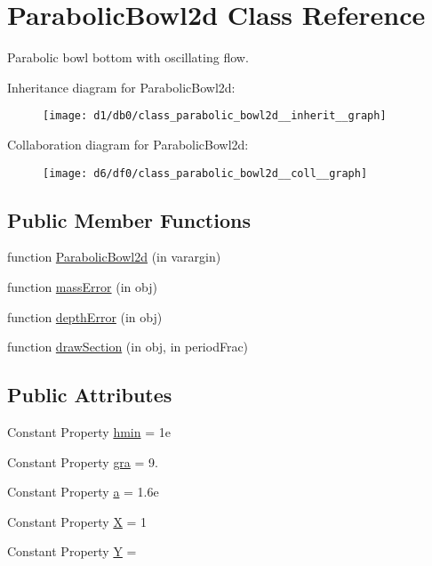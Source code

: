 \hypertarget{class_parabolic_bowl2d}{}\section{Parabolic\+Bowl2d Class Reference}
\label{class_parabolic_bowl2d}


Parabolic bowl bottom with oscillating flow.  




Inheritance diagram for Parabolic\+Bowl2d\+:
\nopagebreak
\begin{figure}[H]
\begin{center}
\leavevmode
\texttt{[image: d1/db0/class\_parabolic\_bowl2d\_\_inherit\_\_graph]}
\end{center}
\end{figure}


Collaboration diagram for Parabolic\+Bowl2d\+:
\nopagebreak
\begin{figure}[H]
\begin{center}
\leavevmode
\texttt{[image: d6/df0/class\_parabolic\_bowl2d\_\_coll\_\_graph]}
\end{center}
\end{figure}
\subsection*{Public Member Functions}
\begin{DoxyCompactItemize}
\item 
function \hyperlink{class_parabolic_bowl2d_a3cf3b16ee5279cc0a9c6782e0bbd40cd}{Parabolic\+Bowl2d} (in varargin)
\item 
function \hyperlink{class_parabolic_bowl2d_a63eb70cd672d3b7eb49076181c51cacf}{mass\+Error} (in obj)
\item 
function \hyperlink{class_parabolic_bowl2d_acf9645dce26099da0f6347d47b80c307}{depth\+Error} (in obj)
\item 
function \hyperlink{class_parabolic_bowl2d_a66ac4c5a907d4a699a11724d96baca43}{draw\+Section} (in obj, in period\+Frac)
\end{DoxyCompactItemize}
\subsection*{Public Attributes}
\begin{DoxyCompactItemize}
\item 
Constant Property \hyperlink{class_parabolic_bowl2d_a25af2e40c35473e7c5d68fcfa1014f44}{hmin} = 1e
\item 
Constant Property \hyperlink{class_parabolic_bowl2d_a068e796d2f651bda56bfd2aabddde952}{gra} = 9.
\item 
Constant Property \hyperlink{class_parabolic_bowl2d_a26b35b403c41dbc6b2dc32cdf2f2a5f3}{a} = 1.\+6e
\item 
Constant Property \hyperlink{class_parabolic_bowl2d_a759f5974b4e94da161f794d529f4bc3a}{X} = 1
\item 
Constant Property \hyperlink{class_parabolic_bowl2d_a4f3beed97857e18d1205a48340b9e9a8}{Y} =
\end{DoxyCompactItemize}
